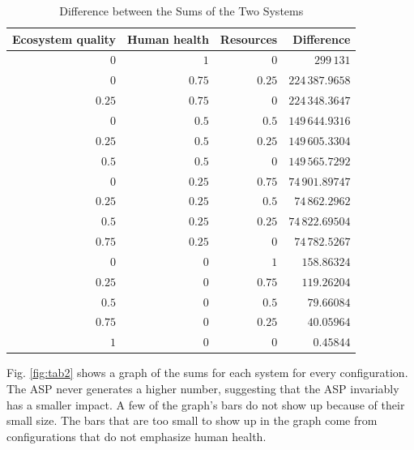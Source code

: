 \documentclass[final,journal,10pt,letterpaper,oneside,twocolumn,compsoc]%
{IEEEtran}
\begin{document}
\begin{table}[t!]
  \caption{Difference between the Sums of the Two Systems}
  \label{tab:15}
  \centering
    \begin{tabular}{| r | r | r | r |}
      \hline
      Ecosystem quality & Human health & Resources & Difference \\
      \hline
      $0$               & $1$          & $0$       & $299\,131$ \\
      $0$               & $0.75$       & $0.25$    & $224\,387.9658$ \\
      $0.25$            & $0.75$       & $0$       & $224\,348.3647$ \\
      $0$               & $0.5$        & $0.5$     & $149\,644.9316$ \\
      $0.25$            & $0.5$        & $0.25$    & $149\,605.3304$ \\
      $0.5$             & $0.5$        & $0$       & $149\,565.7292$ \\
      $0$               & $0.25$       & $0.75$    & $74\,901.89747$ \\
      $0.25$            & $0.25$       & $0.5$     & $74\,862.2962$ \\
      $0.5$             & $0.25$       & $0.25$    & $74\,822.69504$ \\
      $0.75$            & $0.25$       & $0$       & $74\,782.5267$ \\
      $0$               & $0$          & $1$       & $158.86324$ \\
      $0.25$            & $0$          & $0.75$    & $119.26204$ \\
      $0.5$             & $0$          & $0.5$     & $79.66084$ \\
      $0.75$            & $0$          & $0.25$    & $40.05964$ \\
      $1$               & $0$          & $0$       & $0.45844$ \\
      \hline
    \end{tabular}
\end{table}

Fig. \ref{fig:tab2} shows a graph of the sums for each system for every
configuration. The ASP never generates a higher number, suggesting that the ASP
invariably has a smaller impact. A few of the graph's bars do not show up
because
of their small size. The bars that are too small to show up in the graph come
from configurations that do not emphasize human health.
\end{document}
